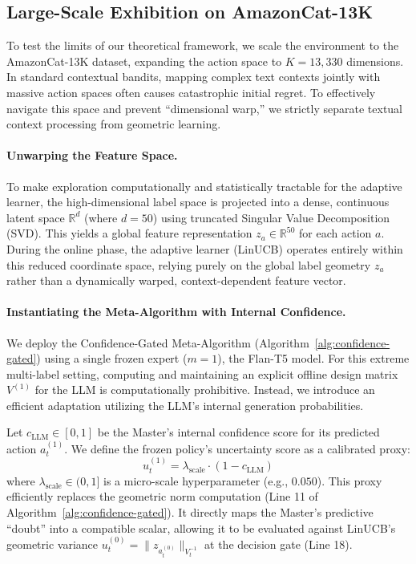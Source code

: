 \clearpage
\subsection{Large-Scale Exhibition on AmazonCat-13K}
\label{sec:amazon_experiments}

To test the limits of our theoretical framework, we scale the environment to the AmazonCat-13K dataset, expanding the action space to $K = 13,330$ dimensions. In standard contextual bandits, mapping complex text contexts jointly with massive action spaces often causes catastrophic initial regret. To effectively navigate this space and prevent ``dimensional warp,'' we strictly separate textual context processing from geometric learning.

\paragraph{Unwarping the Feature Space.}
To make exploration computationally and statistically tractable for the adaptive learner, the high-dimensional label space is projected into a dense, continuous latent space $\mathbb{R}^d$ (where $d=50$) using truncated Singular Value Decomposition (SVD). This yields a global feature representation $z_a \in \mathbb{R}^{50}$ for each action $a$. During the online phase, the adaptive learner (LinUCB) operates entirely within this reduced coordinate space, relying purely on the global label geometry $z_a$ rather than a dynamically warped, context-dependent feature vector.

\paragraph{Instantiating the Meta-Algorithm with Internal Confidence.}
We deploy the Confidence-Gated Meta-Algorithm (Algorithm~\ref{alg:confidence-gated}) using a single frozen expert ($m=1$), the Flan-T5 model. For this extreme multi-label setting, computing and maintaining an explicit offline design matrix $V^{(1)}$ for the LLM is computationally prohibitive. Instead, we introduce an efficient adaptation utilizing the LLM's internal generation probabilities.

Let $c_{\mathrm{LLM}} \in [0, 1]$ be the Master's internal confidence score for its predicted action $a_t^{(1)}$. We define the frozen policy's uncertainty score as a calibrated proxy:
\begin{equation}
    u_t^{(1)} = \lambda_{\mathrm{scale}} \cdot (1 - c_{\mathrm{LLM}})
\end{equation}
where $\lambda_{\mathrm{scale}} \in (0, 1]$ is a micro-scale hyperparameter (e.g., $0.050$). This proxy efficiently replaces the geometric norm computation (Line 11 of Algorithm~\ref{alg:confidence-gated}). It directly maps the Master's predictive ``doubt'' into a compatible scalar, allowing it to be evaluated against LinUCB's geometric variance $u_t^{(0)} = \|z_{a_t^{(0)}}\|_{V_t^{-1}}$ at the decision gate (Line 18).

